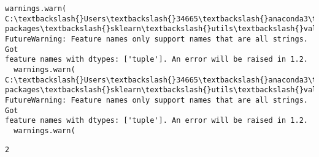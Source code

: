 \documentclass[11pt]{article}
\begin{document}
\begin{Verbatim}[commandchars=\\\{\}]
  warnings.warn(
C:\textbackslash{}Users\textbackslash{}34665\textbackslash{}anaconda3\textbackslash{}lib\textbackslash{}site-packages\textbackslash{}sklearn\textbackslash{}utils\textbackslash{}validation.py:1688:
FutureWarning: Feature names only support names that are all strings. Got
feature names with dtypes: ['tuple']. An error will be raised in 1.2.
  warnings.warn(
C:\textbackslash{}Users\textbackslash{}34665\textbackslash{}anaconda3\textbackslash{}lib\textbackslash{}site-packages\textbackslash{}sklearn\textbackslash{}utils\textbackslash{}validation.py:1688:
FutureWarning: Feature names only support names that are all strings. Got
feature names with dtypes: ['tuple']. An error will be raised in 1.2.
  warnings.warn(
    \end{Verbatim}

    \begin{Verbatim}[commandchars=\\\{\}]
2
    \end{Verbatim}
\end{document}
